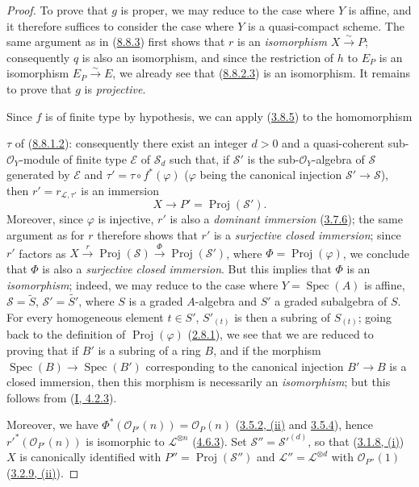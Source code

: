 \begin{proof}
To prove that $g$ is proper, we may reduce to the case where $Y$ is affine,
and it therefore suffices to consider the case where $Y$ is a quasi-compact
scheme. The same argument as in (\hyperref[II.8.8.3]{8.8.3}) first shows
that $r$ is an \emph{isomorphism} $X\xrightarrow{\sim}P$; consequently $q$ is
also an isomorphism, and since the restriction of $h$ to $E_P$ is an
isomorphism $E_P\xrightarrow{\sim}E$, we already see that
(\hyperref[II.8.8.2.3]{8.8.2.3}) is an isomorphism. It remains to prove
that $g$ is \emph{projective}.

Since $f$ is of finite type by hypothesis, we can apply
(\hyperref[II.3.8.5]{3.8.5}) to the homomorphism

$\tau$ of (\hyperref[II.8.8.1.2]{8.8.1.2}): consequently there exist an
integer $d>0$ and a quasi-coherent sub-$\mathcal{O}_Y$-module of finite type
$\mathcal{E}$ of $\mathcal{S}_d$ such that, if $\mathcal{S}'$ is the
sub-$\mathcal{O}_Y$-algebra of $\mathcal{S}$ generated by $\mathcal{E}$ and
$\tau'=\tau\circ f^*(\varphi)$ ($\varphi$ being the canonical injection
$\mathcal{S}'\to\mathcal{S}$), then $r'=r_{\mathcal{L},\tau'}$ is an immersion
\[
  X\longrightarrow P'=\operatorname{Proj}(\mathcal{S}').
\]
Moreover, since $\varphi$ is injective, $r'$ is also a \emph{dominant
immersion} (\hyperref[II.3.7.6]{3.7.6}); the same argument as for $r$
therefore shows that $r'$ is a \emph{surjective closed immersion}; since $r'$
factors as
$X\xrightarrow{r}\operatorname{Proj}(\mathcal{S})
\xrightarrow{\Phi}\operatorname{Proj}(\mathcal{S}')$, where
$\Phi=\operatorname{Proj}(\varphi)$, we conclude that $\Phi$ is also a
\emph{surjective closed immersion}. But this implies that $\Phi$ is an
\emph{isomorphism}; indeed, we may reduce to the case where
$Y=\operatorname{Spec}(A)$ is affine, $\mathcal{S}=\widetilde{S}$,
$\mathcal{S}'=\widetilde{S'}$, where $S$ is a graded $A$-algebra and $S'$ a
graded subalgebra of $S$. For every homogeneous element $t\in S'$,
$S'_{(t)}$ is then a subring of $S_{(t)}$; going back to the
definition of $\operatorname{Proj}(\varphi)$
(\hyperref[II.2.8.1]{2.8.1}), we see that we are reduced to proving that if
$B'$ is a subring of a ring $B$, and if the morphism
$\operatorname{Spec}(B)\to\operatorname{Spec}(B')$ corresponding to the
canonical injection $B'\to B$ is a closed immersion, then this morphism is
necessarily an \emph{isomorphism}; but this follows from
(\hyperref[I.4.2.3]{I, 4.2.3}).

Moreover, we have
$\Phi^*(\mathcal{O}_{P'}(n))=\mathcal{O}_P(n)$
(\hyperref[II.3.5.2]{3.5.2, (ii)} and
\hyperref[II.3.5.4]{3.5.4}), hence
$r'^*(\mathcal{O}_{P'}(n))$ is isomorphic to $\mathcal{L}^{\otimes n}$
(\hyperref[II.4.6.3]{4.6.3}). Set
$\mathcal{S}''=\mathcal{S}'^{(d)}$, so that
(\hyperref[II.3.1.8]{3.1.8, (i)}) $X$ is canonically identified with
$P''=\operatorname{Proj}(\mathcal{S}'')$ and
$\mathcal{L}''=\mathcal{L}^{\otimes d}$ with $\mathcal{O}_{P''}(1)$
(\hyperref[II.3.2.9]{3.2.9, (ii)}).


\end{proof}
